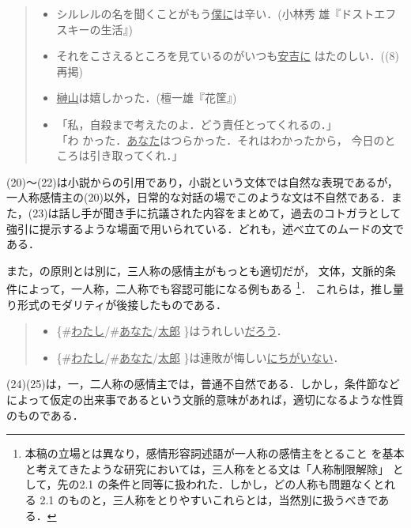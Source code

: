 \vspace{0.3cm}
\begin{quote}
\begin{itemize}
 \item[(20)] シルレルの名を聞くことがもう\underline{僕に}は辛い．(小林秀
	     雄『ドストエフスキーの生活』)
 \item[(21)] それをこさえるところを見ているのがいつも\underline{安吉に}
	     はたのしい．((8)再掲)
 \item[(22)] \underline{榊山}は嬉しかった．(檀一雄『花筐』)
 \item[(23)] 「私，自殺まで考えたのよ．どう責任とってくれるの．」\\「わ
	     かった．\underline{あなた}はつらかった．それはわかったから，
	     今日のところは引き取ってくれ．」
\end{itemize}
\end{quote}
\vspace{0.3cm}

(20)〜(22)は小説からの引用であり，小説という文体では自然な表現であるが，
一人称感情主の(20)以外，日常的な対話の場でこのような文は不自然である．ま
た，(23)は話し手が聞き手に抗議された内容をまとめて，過去のコトガラとして
強引に提示するような場面で用いられている．どれも，述べ立てのムードの文で
ある．

また，\cite{益岡1997}の原則とは別に，三人称の感情主がもっとも適切だが，
文体，文脈的条件によって，一人称，二人称でも容認可能になる例もある
\footnote{本稿の立場とは異なり，感情形容詞述語が一人称の感情主をとること
を基本と考えてきたような研究においては，三人称をとる文は「人称制限解除」
として，先の2.1 の条件と同等に扱われた．しかし，どの人称も問題なくとれる
2.1 のものと，三人称をとりやすいこれらとは，当然別に扱うべきである．}．
これらは，推し量り形式のモダリティが後接したものである．

\vspace{0.3cm}
\begin{quote}
\begin{itemize}
 \item[(24)] \{\#\underline{わたし}/\#\underline{あなた}/\underline{太郎}
	     \}はうれしい\underline{だろう}．
 \item[(25)] \{\#\underline{わたし}/\#\underline{あなた}/\underline{太郎}
	     \}は連敗が悔しい\underline{にちがいない}．
\end{itemize}
\end{quote}
\vspace{0.3cm}

(24)(25)は，一，二人称の感情主では，普通不自然である．しかし，条件節など
によって仮定の出来事であるという文脈的意味があれば，適切になるような性質
のものである．

